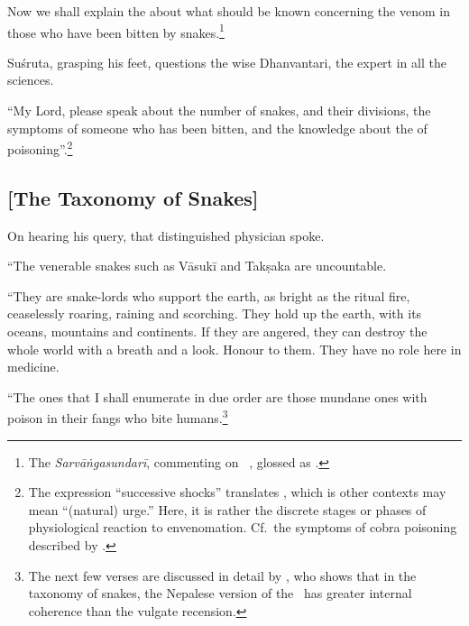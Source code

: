 \begin{translation}
    \item[1] Now we shall explain the  about what should be 
    known concerning the venom in those who have been bitten by
snakes.\footnote{\label{arunadatta:kalpa}The \emph{Sarvāṅgasundarī}, 
commenting on
    \AH\ , glossed  as .}
    
    \item[3] Suśruta, grasping his feet, questions the wise Dhanvantari, the 
    expert in all the sciences.



    \item[4]
    
    “My Lord, please speak about the number of snakes, and their divisions,
the symptoms of someone who has been bitten, and the knowledge
about the  of poisoning”.\footnote{The
    expression “successive shocks” translates , which is other
    contexts may mean “(natural) urge.”  Here, it is rather the discrete
    stages or phases of physiological reaction to envenomation.  Cf.\ the
    symptoms of cobra poisoning described by \citet[80]{wall-1913}.}
        
        
\subsection{[The Taxonomy of Snakes]}
        
    \item[5]
    
    On hearing his query, that distinguished physician spoke.
    
    “The venerable snakes such as Vāsukī and Takṣaka are uncountable. 
    
\item[6--9ab]

“They are snake-lords who support the earth, as bright as the ritual fire,
ceaselessly roaring, raining and scorching. They hold up the earth, with its
oceans, mountains and continents. If they are angered, they can destroy the
whole world with a breath and a look.  Honour to them. They have no role
here in medicine.

“The ones that I shall enumerate in due order are those mundane
ones with poison in their fangs who bite humans.\footnote{The next few
    verses are discussed in detail by \citet[101--104]{hari-2011}, who shows
    that in the taxonomy of snakes, the Nepalese version of the \SS\ has greater
    internal coherence than the vulgate recension.}


\end{translation}

